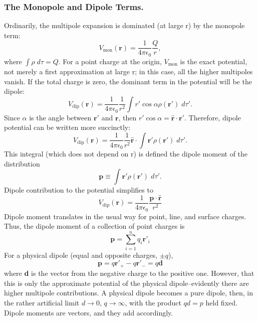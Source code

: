 \documentclass[../../../main.tex]{subfiles}
\begin{document}
\subsubsection*{The Monopole and Dipole Terms.} Ordinarily, the multipole expansion is dominated (at large r) by the monopole
term:
\begin{equation*}
     V_{\text{mon}}(\mathbf{r})=\frac{1}{4\pi \epsilon_0}\frac{Q}{r},
\end{equation*}
where $\int\rho\; d\tau=Q$. For a point charge at the origin, $ V_{\text{mon}}$ is the exact potential, not merely a first approximation at large r; in this case, all the higher multipoles vanish. If the total charge is zero, the dominant term in the potential will be the dipole:
\begin{equation*}
     V_{\text{dip}}(\mathbf{r})=\frac{1}{4\pi \epsilon_0}\frac{1}{r^2}\int r'\cos \alpha \rho(\mathbf{r}')\; d\tau'.
\end{equation*}
Since $\alpha$ is the angle between $\mathbf{r'}$ and $\mathbf{r}$, then $r' \cos \alpha = \mathbf{\hat{r}} \cdot \mathbf{r'}$. Therefore, dipole potential can be written more succinctly:
\begin{equation*}
     V_{\text{dip}}(\mathbf{r})=\frac{1}{4\pi \epsilon_0}\frac{1}{r^2}\mathbf{\hat{r}}\cdot\int \mathbf{r'} \rho(\mathbf{r}')\; d\tau'.
\end{equation*}
This integral (which does not depend on r) is defined the dipole moment of the distribution
\begin{equation*}
    \mathbf{p}\equiv \int\mathbf{r'} \rho(\mathbf{r}')\; d\tau'.
\end{equation*}
Dipole contribution to the potential simplifies to
\begin{equation*}
     V_{\text{dip}}(\mathbf{r})=\frac{1}{4\pi \epsilon_0}\frac{\mathbf{p}\cdot \mathbf{\hat{r}}}{r^2}
\end{equation*}
Dipole moment translates in the usual way for point, line, and surface charges. Thus, the dipole moment of a collection of point charges is
\begin{equation*}
    \mathbf{p}=\sum_{i=1}^{n}q_i\mathbf{r'}_i
\end{equation*}
For a physical dipole (equal and opposite charges, $\pm q$),
\begin{equation*}
    \mathbf{p}=q\mathbf{r'}_+-q\mathbf{r'}_-=q\mathbf{d}
\end{equation*}
where \textbf{d} is the vector from the negative charge to the positive one. However, that this is only the approximate potential of the physical dipole--evidently there are higher multipole contributions. A physical dipole becomes a pure dipole, then, in the rather artificial limit $d \rightarrow0$, $q\rightarrow \infty$, with the product $qd = p$ held fixed. Dipole moments are vectors, and they add accordingly.
\end{document}
